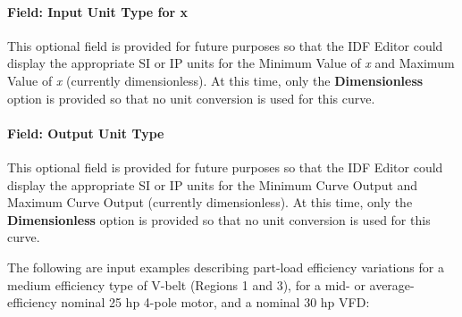 \paragraph{Field: Input Unit Type for x}\label{field-input-unit-type-for-x-15}

This optional field is provided for future purposes so that the IDF Editor could display the appropriate SI or IP units for the Minimum Value of \emph{x} and Maximum Value of \emph{x} (currently dimensionless). At this time, only the \textbf{Dimensionless} option is provided so that no unit conversion is used for this curve.

\paragraph{Field: Output Unit Type}\label{field-output-unit-type-14}

This optional field is provided for future purposes so that the IDF Editor could display the appropriate SI or IP units for the Minimum Curve Output and Maximum Curve Output (currently dimensionless). At this time, only the \textbf{Dimensionless} option is provided so that no unit conversion is used for this curve.

The following are input examples describing part-load efficiency variations for a medium efficiency type of V-belt (Regions 1 and 3), for a mid- or average-efficiency nominal 25 hp 4-pole motor, and a nominal 30 hp VFD:


